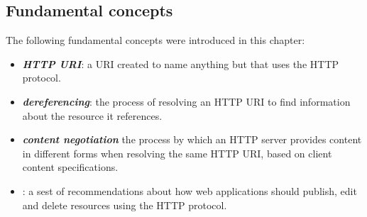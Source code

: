 \hypertarget{fundamental-concepts}{%
\subsection{Fundamental concepts}\label{fundamental-concepts}}

The following fundamental concepts were introduced in this chapter:

\begin{itemize}
\item
  \emph{\textbf{HTTP URI}}: a URI created to name anything but that
  uses the HTTP protocol.
\item
  \emph{\textbf{dereferencing}}: the process of resolving an HTTP URI to find information about 
  the resource it references. 
\item
  \emph{\textbf{content negotiation}} the process by which an HTTP server provides content in different forms when 
  resolving the
  same HTTP URI, based on client content specifications.  

\item 
  \emph{}: a sest of recommendations about how web applications should 
  publish, edit and delete resources using the HTTP protocol.
\end{itemize}

